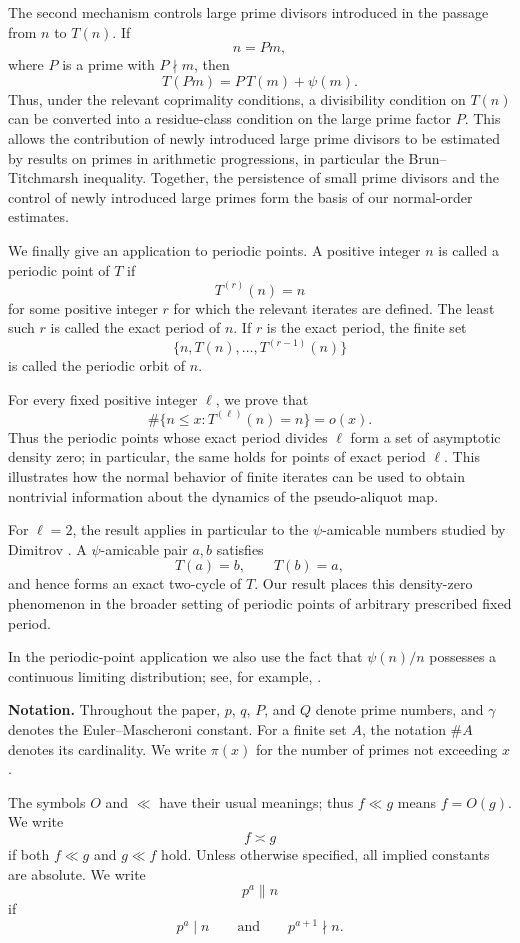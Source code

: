 \documentclass{article}
\begin{document}
The second mechanism controls large prime divisors introduced in the
passage from $n$ to $T(n)$. If
\[
n=Pm,
\]
where $P$ is a prime with $P\nmid m$, then
\[
T(Pm)
=
P\,T(m)+\psi(m).
\]
Thus, under the relevant coprimality conditions, a divisibility
condition on $T(n)$ can be converted into a residue-class condition
on the large prime factor $P$. This allows the contribution of newly
introduced large prime divisors to be estimated by results on primes
in arithmetic progressions, in particular the Brun--Titchmarsh
inequality. Together, the persistence of small prime divisors and the
control of newly introduced large primes form the basis of our
normal-order estimates.

We finally give an application to periodic points. A positive integer
$n$ is called a periodic point of $T$ if
\[
T^{(r)}(n)=n
\]
for some positive integer $r$ for which the relevant iterates are
defined. The least such $r$ is called the exact period of $n$. If
$r$ is the exact period, the finite set
\[
\{n,T(n),\ldots,T^{(r-1)}(n)\}
\]
is called the periodic orbit of $n$.

For every fixed positive integer $\ell$, we prove that
\[
\#\{n\le x:T^{(\ell)}(n)=n\}=o(x).
\]
Thus the periodic points whose exact period divides $\ell$ form a set
of asymptotic density zero; in particular, the same holds for points
of exact period $\ell$. This illustrates how the normal behavior of
finite iterates can be used to obtain nontrivial information about the
dynamics of the pseudo-aliquot map.

For $\ell=2$, the result applies in particular to the
$\psi$-amicable numbers studied by Dimitrov
\cite{Dimitrov2025}. A $\psi$-amicable pair $a,b$ satisfies
\[
T(a)=b,\qquad T(b)=a,
\]
and hence forms an exact two-cycle of $T$. Our result places this
density-zero phenomenon in the broader setting of periodic points of
arbitrary prescribed fixed period.

In the periodic-point application we also use the fact that
$\psi(n)/n$ possesses a continuous limiting distribution; see, for
example, \cite[Chapter~III.4, Theorem~1]{ref13}.

\medskip
\noindent\textbf{Notation.}
Throughout the paper, $p$, $q$, $P$, and $Q$ denote prime numbers,
and $\gamma$ denotes the Euler--Mascheroni constant. For a finite set
$A$, the notation $\#A$ denotes its cardinality. We write $\pi(x)$
for the number of primes not exceeding $x$.

The symbols $O$ and $\ll$ have their usual meanings; thus
$f\ll g$ means $f=O(g)$. We write
\[
f\asymp g
\]
if both $f\ll g$ and $g\ll f$ hold. Unless otherwise specified,
all implied constants are absolute. We write
\[
p^a\parallel n
\]
if
\[
p^a\mid n
\qquad\text{and}\qquad
p^{a+1}\nmid n.
\]
\end{document}
